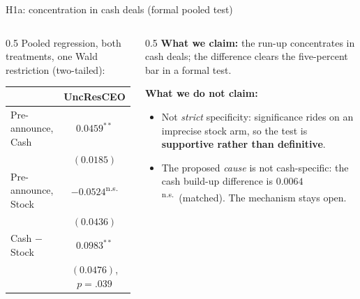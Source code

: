 \documentclass[aspectratio=169, 11pt]{beamer}
\newcommand{\ns}{\textsuperscript{n.s.}}
\begin{document}
\begin{frame}{H1a: concentration in cash deals (formal pooled test)}
  \begin{columns}[T]
    \begin{column}{0.5\textwidth}
      Pooled regression, both treatments, one Wald restriction
      (two-tailed):
      \vspace{0.4em}
      \begin{center}
      \small
      \begin{tabular}{lc}
        \toprule
        & UncResCEO \\
        \midrule
        Pre-announce, Cash & $\mathbf{0.0459}^{**}$ \\
        & $(0.0185)$ \\
        Pre-announce, Stock & $-0.0524$\ns \\
        & $(0.0436)$ \\
        \midrule
        Cash $-$ Stock & $\mathbf{0.0983}^{**}$ \\
        & $(0.0476)$, $p=.039$ \\
        \bottomrule
      \end{tabular}
      \end{center}
    \end{column}
    \begin{column}{0.5\textwidth}
      \textbf{What we claim:} the run-up \alert{concentrates} in cash deals;
      the difference clears the five-percent bar in a formal test.
      \vspace{0.5em}

      \textbf{What we do not claim:}
      \begin{itemize}
        \item Not \emph{strict} specificity: significance rides on an
          imprecise stock arm, so the test is
          \textbf{supportive rather than definitive}.
        \item The proposed \emph{cause} is not cash-specific: the
          cash build-up difference is $0.0064$\ns\ (matched).
          \alert{The mechanism stays open.}
      \end{itemize}
    \end{column}
  \end{columns}
\end{frame}
\end{document}
